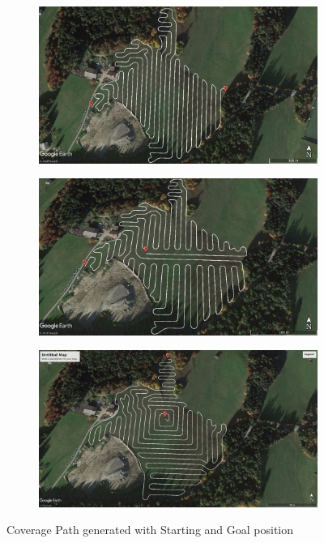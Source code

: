 \begin{figure}[ht]
	\centering
	\begin{subfigure}{0.49\textwidth}
	  \centering
	  \includegraphics[width=0.95\linewidth]{figures/Field3/Field3-CoverageGE-BSpline-noBorder.jpg}
	  \caption{}
	  \label{sfig:F3-regular-start-pos}
	\end{subfigure}
	\begin{subfigure}{0.49\textwidth}
	  \centering
	  \includegraphics[width=0.95\linewidth]{figures/Field3/Field3-CoverageDifferentStartingPosition.jpg}
	  \caption{}
	  \label{sfig:F3-modified-start-pos}
	\end{subfigure}
	\begin{subfigure}{0.49\textwidth}
	  \centering
	  \includegraphics[width=1\linewidth]{figures/Field3/Field3-CoverageDifferentStartingGoalPosition.jpg}
	  \caption{}
	  \label{sfig:F3-modified-start-goal-pos}
	\end{subfigure}
	\caption{Coverage Path generated with Starting and Goal position}
    \label{fig:coverage-start-goal-pos}
\end{figure}
